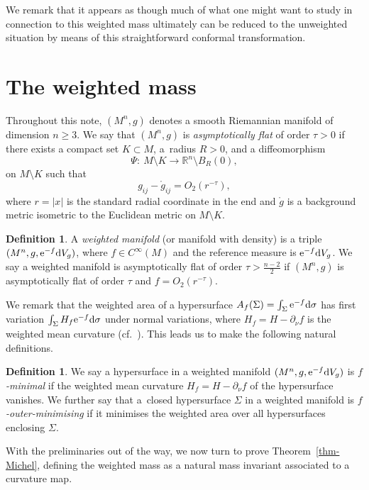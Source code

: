 \documentclass[pdftex]{sigma}
\numberwithin{equation}{section}
\theoremstyle{definition}
\newtheorem{Definition}[Theorem]{Definition}
\begin{document}
We remark that it appears as though much of what one might want to study in connection to this weighted mass ultimately can be reduced to the unweighted situation by means of this straightforward conformal transformation.



\section{The weighted mass}\label{sec-michel}

Throughout this note, $(M^n,g)$ denotes a smooth Riemannian manifold of dimension $n\geq3$. We say that $(M^n,g)$ is \emph{asymptotically flat} of order $\tau>0$ if there exists a compact set $K\subset M$, a~radius $R>0$, and a diffeomorphism
\[
\Psi \colon \  M\setminus K \longrightarrow \mathbb{R}^n\setminus B_R(0),
\]
on $M\setminus K$ such that
\[
g_{ij} - \mathring g_{ij} = O_2(r^{-\tau}),
\]
where $r=|x|$ is the standard radial coordinate in the end and $\mathring g$ is a background metric isometric to the Euclidean metric on $M\setminus K$.

\begin{Definition}\label{def-AF}
	A \emph{weighted manifold} (or manifold with density) is a triple $(M^n,g,{\rm e}^{-f}{\rm d}V_g)$, where $f\in C^\infty(M)$ and the reference measure is ${\rm e}^{-f}{\rm d}V_g$. We say a weighted manifold is asymptotically flat of order $\tau>\frac{n-2}{2}$ if $(M^n,g)$ is asymptotically flat of order $\tau$ and $f=O_2(r^{-\tau})$.
\end{Definition}

We remark that the weighted area of a hypersurface $A_f(\Sigma)=\int_\Sigma {\rm e}^{-f}{\rm d}\sigma$ has first variation $\int_\Sigma H_f {\rm e}^{-f}{\rm d}\sigma$ under normal variations, where $H_f=H-\partial_\nu f$ is the weighted mean curvature (cf.~\cite{BaldaufOzuch22}). This leads us to make the following natural definitions.
\begin{Definition} \label{def-weighted-min}
	We say a hypersurface in a weighted manifold $(M^n,g,{\rm e}^{-f}{\rm d}V_g)$ is \emph{$f$-minimal} if the weighted mean curvature $H_f=H-\partial_\nu f$ of the hypersurface vanishes. We further say that a~closed hypersurface $\Sigma$ in a weighted manifold is \emph{$f$-outer-minimising} if it minimises the weighted area over all hypersurfaces enclosing $\Sigma$.
\end{Definition}

With the preliminaries out of the way, we now turn to prove Theorem~\ref{thm-Michel}, defining the weighted mass as a natural mass invariant associated to a curvature map.
\end{document}
